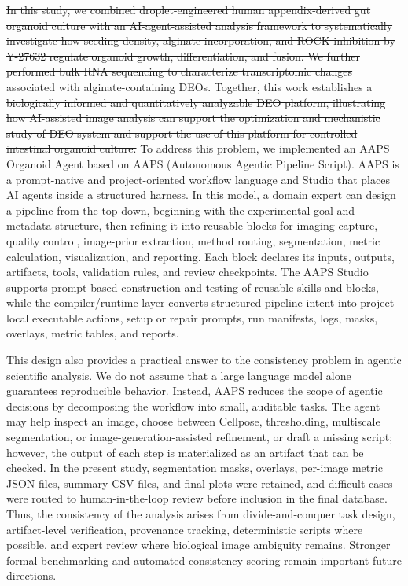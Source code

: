 \documentclass[
]{article}
\providecommand{\DIFadd}[1]{{\begingroup\color{blue}#1\endgroup}}
\providecommand{\DIFdel}[1]{{\begingroup\color{red}\sout{#1}\endgroup}}
\begin{document}
\DIFdel{In this study, we combined droplet-engineered human appendix-derived gut organoid culture with an AI-agent-assisted analysis framework to systematically investigate how seeding density, alginate incorporation, and ROCK inhibition by Y-27632 regulate organoid growth, differentiation, and fusion. We further performed bulk RNA sequencing to characterize transcriptomic changes associated with alginate-containing DEOs. Together, this work establishes a biologically informed and quantitatively analyzable DEO platform, illustrating how AI-assisted image analysis can support the optimization and mechanistic study of DEO system and support the use of this platform for controlled intestinal organoid culture.}
\DIFadd{To address this problem, we implemented an AAPS Organoid Agent based on AAPS (Autonomous Agentic Pipeline Script). AAPS is a prompt-native and project-oriented workflow language and Studio that places AI agents inside a structured harness. In this model, a domain expert can design a pipeline from the top down, beginning with the experimental goal and metadata structure, then refining it into reusable blocks for imaging capture, quality control, image-prior extraction, method routing, segmentation, metric calculation, visualization, and reporting. Each block declares its inputs, outputs, artifacts, tools, validation rules, and review checkpoints. The AAPS Studio supports prompt-based construction and testing of reusable skills and blocks, while the compiler/runtime layer converts structured pipeline intent into project-local executable actions, setup or repair prompts, run manifests, logs, masks, overlays, metric tables, and reports.}

\DIFadd{This design also provides a practical answer to the consistency problem in agentic scientific analysis. We do not assume that a large language model alone guarantees reproducible behavior. Instead, AAPS reduces the scope of agentic decisions by decomposing the workflow into small, auditable tasks. The agent may help inspect an image, choose between Cellpose, thresholding, multiscale segmentation, or image-generation-assisted refinement, or draft a missing script; however, the output of each step is materialized as an artifact that can be checked. In the present study, segmentation masks, overlays, per-image metric JSON files, summary CSV files, and final plots were retained, and difficult cases were routed to human-in-the-loop review before inclusion in the final database. Thus, the consistency of the analysis arises from divide-and-conquer task design, artifact-level verification, provenance tracking, deterministic scripts where possible, and expert review where biological image ambiguity remains. Stronger formal benchmarking and automated consistency scoring remain important future directions.}
\end{document}
